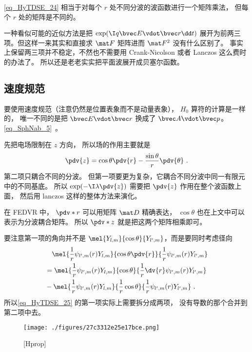 \autoref{eq_HyTDSE_24} 相当于对每个 $r$ 处不同分波的波函数进行一个矩阵乘法， 但每个 $r$ 处的矩阵是不同的。

一种看似可能的近似方法是把 $\exp(\I q\bvec E\vdot\bvec r\dd t)$ 展开为前两三项。但这样一来其实和直接求 $\mat F$ 矩阵进而 $\mat F^2$ 没有什么区别了。 事实上保留两三项并不稳定，不然也不需要用 Crank-Nicolson 或者 Lanczos 这么费时的办法了。 所以还是老老实实把平面波展开成贝塞尔函数。

\subsection{速度规范}
要使用速度规范（注意仍然是位置表象而不是动量表象）， $H_0$ 算符的计算是一样的， 唯一不同的是把 $\bvec E\vdot \bvec r$ 换成了 $\bvec A\vdot \bvec p$。 \autoref{eq_SphNab_5}~。

先把电场限制在 $z$ 方向， 所以场的作用主要就是
\begin{equation}\label{eq_HyTDSE_25}
\pdv{z} = \cos\theta\pdv{r} - \frac{\sin\theta}{r}\pdv{\theta}~.
\end{equation}
第二项只耦合不同的分波。 但第一项要更为复杂，它耦合不同分波中同一有限元中的不同基底。 所以 $\exp(-\I \lambda \pdv{z})$ 需要把 $\pdv{z}$ 作用在整个波函数上面， 然后用 lanczos 这样的整体方法来演化。

在 FEDVR 中， $\pdv*{r}$ 可以用矩阵 $\mat D$ 精确表达， $\cos\theta$ 也在上文中可以表示为分波耦合矩阵。 所以 $\pdv*{z}$ 就是把这两个矩阵相乘即可。

要注意第一项的角向并不是 $\mel{Y_{l,m}}{\cos\theta}{Y_{l',m}}$，而是要同时考虑径向
\begin{equation}
\begin{aligned}
&\quad\mel{\frac{1}{r}\psi_{l',m}(r)Y_{l,m}}{\cos\theta\pdv{r}}{\frac{1}{r}\psi_{l',m}(r)Y_{l',m}}\\
&= \mel{\frac{1}{r}\psi_{l',m}(r)Y_{l,m}}{\cos\theta}{\frac{1}{r}\dv{r}\psi_{l',m}(r)Y_{l',m}}\\
& -\mel{\frac{1}{r}\psi_{l',m}(r)Y_{l,m}}{\frac{1}{r}\cos\theta}{\frac{1}{r}\psi_{l',m}(r)Y_{l',m}}~.
\end{aligned}
\end{equation}
所以\autoref{eq_HyTDSE_25} 的第一项实际上需要拆分成两项， 没有导数的那个合并到第二项中去。
\begin{figure}[ht]
\centering
\texttt{[image: ./figures/27c3312e25e17bce.png]}
\caption{[Hprop]} \label{fig_HyTDSE_1}
\end{figure}
